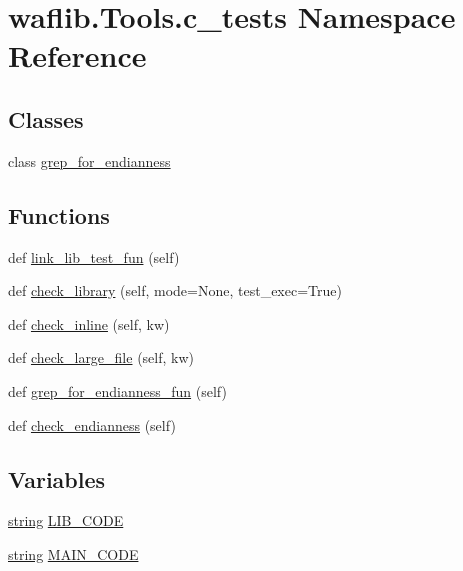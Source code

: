 \hypertarget{namespacewaflib_1_1_tools_1_1c__tests}{}\section{waflib.\+Tools.\+c\+\_\+tests Namespace Reference}
\label{namespacewaflib_1_1_tools_1_1c__tests}
\subsection*{Classes}
\begin{DoxyCompactItemize}
\item 
class \hyperlink{classwaflib_1_1_tools_1_1c__tests_1_1grep__for__endianness}{grep\+\_\+for\+\_\+endianness}
\end{DoxyCompactItemize}
\subsection*{Functions}
\begin{DoxyCompactItemize}
\item 
def \hyperlink{namespacewaflib_1_1_tools_1_1c__tests_a58fcfbe9b3ba09e1a057dc1276435776}{link\+\_\+lib\+\_\+test\+\_\+fun} (self)
\item 
def \hyperlink{namespacewaflib_1_1_tools_1_1c__tests_a6769fa909685b6d42bde7746f3e59a64}{check\+\_\+library} (self, mode=None, test\+\_\+exec=True)
\item 
def \hyperlink{namespacewaflib_1_1_tools_1_1c__tests_a8c36c48a71d56e13d6a7973972ef7fb8}{check\+\_\+inline} (self, kw)
\item 
def \hyperlink{namespacewaflib_1_1_tools_1_1c__tests_ac29778f60925677c62b37a4da6a94322}{check\+\_\+large\+\_\+file} (self, kw)
\item 
def \hyperlink{namespacewaflib_1_1_tools_1_1c__tests_a94db04af071d40c6a2b181ae0925389c}{grep\+\_\+for\+\_\+endianness\+\_\+fun} (self)
\item 
def \hyperlink{namespacewaflib_1_1_tools_1_1c__tests_a83231aa06753183ca283a2d9b4cf39ce}{check\+\_\+endianness} (self)
\end{DoxyCompactItemize}
\subsection*{Variables}
\begin{DoxyCompactItemize}
\item 
\hyperlink{test__lib_f_l_a_c_2format_8c_ab02026ad0de9fb6c1b4233deb0a00c75}{string} \hyperlink{namespacewaflib_1_1_tools_1_1c__tests_ae55534ed45f25e72dccefce73e17174a}{L\+I\+B\+\_\+\+C\+O\+DE}
\item 
\hyperlink{test__lib_f_l_a_c_2format_8c_ab02026ad0de9fb6c1b4233deb0a00c75}{string} \hyperlink{namespacewaflib_1_1_tools_1_1c__tests_a24e46dceb7dade3c3b2a74f62a366105}{M\+A\+I\+N\+\_\+\+C\+O\+DE}
\end{DoxyCompactItemize}


